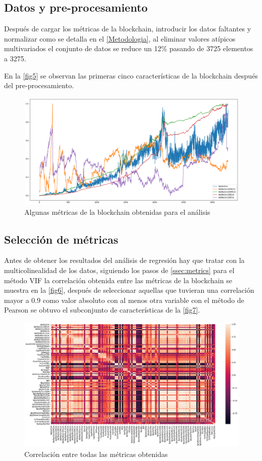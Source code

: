 \subsection{Datos y pre-procesamiento}
Después de cargar los métricas de la blockchain, introducir los datos faltantes y normalizar como se detalla en el \autoref{Metodologia}, al eliminar valores atípicos multivariados el conjunto de datos se reduce un 12\%  pasando de 3725 elementos a 3275.

En la \autoref{fig5} se observan las primeras cinco características de la blockchain después del pre-procesamiento.

\begin{figure}[!h]
	\centering
	\includegraphics[scale=0.34]{Chapter5/metrics_1.png}
	\caption{Algunas métricas de la blockchain obtenidas para el análisis}
	\label{fig5}
\end{figure}

\subsection{Selección de métricas}

Antes de obtener los resultados del análisis de regresión hay que tratar con la multicolinealidad de los datos, siguiendo los pasos de \autoref{ssec:metrics} para el método VIF la correlación obtenida entre las métricas de la blockchain se muestra en la \autoref{fig6}, después de seleccionar aquellas que tuvieran una correlación mayor a $0.9$ como valor absoluto con al menos otra variable con el método de Pearson se obtuvo el subconjunto de características de la \autoref{fig7}. 

\begin{figure}[!h]
	\centering
	\includegraphics[scale=0.4]{Chapter5/corr_map.png}
	\caption{Correlación entre todas las métricas obtenidas}
	\label{fig6}
\end{figure}

